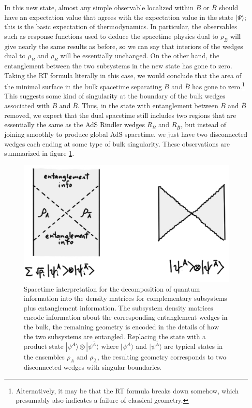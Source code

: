 \documentclass[12pt,epsf]{article}
\begin{document}
In this new state, almost any simple observable localized within $B$ or $\bar{B}$ should have an expectation value that agrees with the expectation value in the state $|\Psi \rangle$; this is the basic expectation of thermodynamics. In particular, the observables such as response functions used to deduce the spacetime physics dual to $\rho_B$ will give nearly the same results as before, so we can say that interiors of the wedges dual to $\rho_B$ and $\rho_{\bar{B}}$ will be essentially unchanged. On the other hand, the entanglement between the two subsystems in the new state has gone to zero. Taking the RT formula literally in this case, we would conclude that the area of the minimal surface in the bulk spacetime separating $B$ and $\bar{B}$ has gone to zero.\footnote{Alternatively, it may be that the RT formula breaks down somehow, which presumably also indicates a failure of classical geometry.} This suggests some kind of singularity at the boundary of the bulk wedges associated with $B$ and $\bar{B}$. Thus, in the state with entanglement between $B$ and $\bar{B}$ removed, we expect that the dual spacetime still includes two regions that are essentially the same as the AdS Rindler wedges $R_B$ and $R_{\bar{B}}$, but instead of joining smoothly to produce global AdS spacetime, we just have two disconnected wedges each ending at some type of bulk singularity. These observations are summarized in figure \ref{disentangle}.

\begin{figure}
\centering
\includegraphics[width = 0.7 \textwidth]{disentangle.eps}
\caption{Spacetime interpretation for the decomposition of quantum information into the density matrices for complementary subsystems plus entanglement information. The subsystem density matrices encode information about the corresponding entanglement wedges in the bulk, the remaining geometry is encoded in the details of how the two subsystems are entangled. Replacing the state with a product state $|\psi^A \rangle \otimes |\psi^{\bar{A}} \rangle$ where $|\psi^A \rangle$ and $|\psi^{\bar{A}} \rangle$ are typical states in the ensembles $\rho_A$ and $\rho_{\bar{A}}$, the resulting geometry corresponds to two disconnected wedges with singular boundaries.}
\label{disentangle}
\end{figure}
\end{document}
